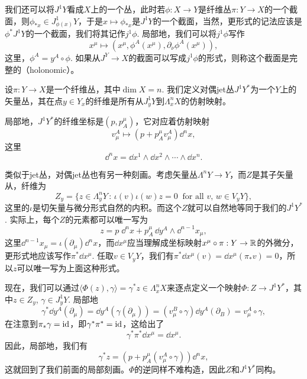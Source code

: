 我们还可以将$J^1Y$看成$X$上的一个丛，此时若$\phi:X\to Y$是纤维丛$\pi:Y\to X$的一个截面，则$\phi_{*x}\in J^1_{\phi(x)}Y$，于是$x\mapsto \phi_{*x}$是$J^1Y$的一个截面，当然，更形式的记法应该是$\phi^*J^1Y$的一个截面，我们将其记作$j^1\phi$. 局部地，我们可以将$j^1\phi$写作
\[
    x^\mu \mapsto \left (x^\mu,\phi^A(x^\mu),\partial_\nu \phi^A(x^\mu)\right ),
\]
这里，$\phi^A=y^A\circ \phi$. 如果从$J^Y\to X$的截面可以写成$j^1\phi$的形式，则称这个截面是完整的（holonomic）。



\begin{para}[对偶jet丛]
    设$\pi:Y\to X$是一个纤维丛，其中$\dim X=n$. 我们定义对偶jet丛$J^1Y^*$为一个$Y$上的矢量丛，其在点$y\in Y_x$的纤维是所有从$J^1_yY$到$\Lambda^n_x X$的仿射映射。
\end{para}

局部地，$J^1Y^*$的纤维坐标是$(p,p_A^\mu)$，它对应着仿射映射
\[
    v^A_\mu\mapsto \left (p+p_A^\mu v^A_\mu \right )\dd^n x,
\]
这里
\[
    \dd^n x=\dd x^1\wedge \dd x^2\wedge \cdots \wedge \dd x^n.
\]

类似于jet丛，对偶jet丛也有另一种刻画。考虑矢量丛$\Lambda^n Y\to Y$，而$Z$是其子矢量从，纤维为
\[
    Z_y=\{z\in \Lambda^n_y Y\,:\,\iota(v)\iota(w)z=0\;\;\text{for all $v$, $w\in V_yY$}\},
\]
这里的$\iota$是切矢量与微分形式自然的内积。而这个$Z$就可以自然地等同于我们的$J^1Y^*$. 实际上，每个$Z$的元素都可以唯一写为
\[
    z=p\;\dd^n x+p_A^\mu \,\dd y^A\wedge \dd^{n-1}x_\mu,
\]
这里$\dd^{n-1}x_\mu=\iota(\partial_\mu)\dd^n x$，而$\dd x^\mu$应当理解成坐标映射$x^\mu\circ \pi:Y\to \mathbb{R}$的外微分，更形式地应该写作$\pi^*\dd x^\mu$. 任取$v\in V_y Y$，我们有$\pi^* \dd x^\mu(v)=\dd x^\mu (\pi_* v)=0$，所以$z$可以唯一写为上面这种形式。

现在，我们可以通过$\langle \Phi(z),\gamma\rangle =\gamma^*z\in \Lambda^{n}_x X$来逐点定义一个映射$\Phi:Z\to J^1Y^*$，其中$z\in Z_y$, $\gamma\in J^1_y Y$. 局部地
\[
    \gamma^*\dd y^A(\partial_\mu)=\dd y^A(\gamma (\partial_\mu))=
    (v^B_\mu\circ \gamma) \dd y^A(\partial_B)=v^A_\mu\circ \gamma,
\]
在注意到$\pi_*\gamma=\operatorname{id}$，即$\gamma^*\pi^*=\operatorname{id}$，这给出了
\[
    \gamma^*\pi^*\dd x^\mu=\dd x^\mu.
\]
因此，局部地，我们有
\[
    \gamma^*z = \left(p+p_A^\mu (v^A_\mu\circ \gamma)\right)\dd^n x,
\]
这就回到了我们前面的局部刻画。$\Phi$的逆同样不难构造，因此$Z$和$J^1Y^*$同构。

